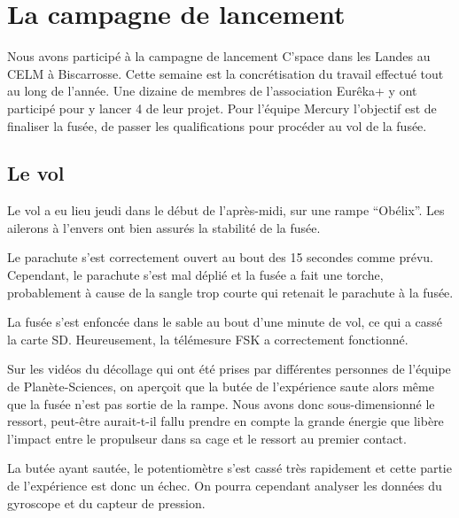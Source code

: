 \documentclass[a4paper,12pt]{scrartcl}
\begin{document}
	 \newpage

	\section{La campagne de lancement}
	
	Nous avons participé à la campagne de lancement C'space dans les Landes au \textsc{CELM} à Biscarrosse.
	Cette semaine est la concrétisation du travail effectué tout au long de l'année.
	Une dizaine de membres de l'association Eurêka+ y ont participé pour y lancer 4 de leur projet.
	Pour l'équipe Mercury l'objectif est de finaliser la fusée, de passer les qualifications pour procéder au vol de la fusée.

	  \subsection{Le vol}
	  
	  Le vol a eu lieu jeudi dans le début de l'après-midi, sur une rampe ``Obélix''. 	
	  Les ailerons à l'envers ont bien assurés la stabilité de la fusée.

	  Le parachute s'est correctement ouvert au bout des 15 secondes comme prévu.
	  Cependant, le parachute s'est mal déplié et la fusée a fait une torche, probablement à cause de la sangle trop courte qui retenait le parachute à la fusée.
	  
	  La fusée s'est enfoncée dans le sable au bout d'une minute de vol, ce qui a cassé la carte SD. Heureusement, la télémesure FSK a correctement fonctionné.
	  
	  Sur les vidéos du décollage qui ont été prises par différentes personnes de l'équipe de Planète-Sciences, on aperçoit que la butée de l'expérience saute alors même que la fusée n'est pas sortie de la rampe.
	  Nous avons donc sous-dimensionné le ressort, peut-être aurait-t-il fallu prendre en compte la grande énergie que libère l'impact entre le propulseur dans sa cage et le ressort au premier contact.
	  
	  La butée ayant sautée, le potentiomètre s'est cassé très rapidement et cette partie de l'expérience est donc un échec.
	  On pourra cependant analyser les données du gyroscope et du capteur de pression.
\end{document}
